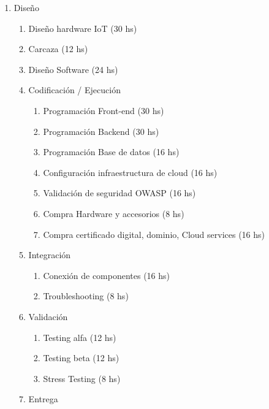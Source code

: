 \documentclass[11pt]{charter}
\begin{document}
\begin{consigna}
\begin{enumerate}
\item Diseño

        \begin{enumerate}

        \item Diseño hardware IoT (30 hs)
        \item Carcaza  (12 hs)
        \item Diseño Software (24 hs)
\item Codificación / Ejecución

        \begin{enumerate}

        \item Programación Front-end (30 hs)
        \item Programación Backend (30 hs)
        \item Programación Base de datos (16 hs)
        \item Configuración infraestructura de cloud (16 hs)

        \item Validación de seguridad OWASP (16 hs)
        \item Compra Hardware y accesorios (8 hs)
        \item Compra certificado digital, dominio, Cloud services (16 hs)
        \end{enumerate}

\item Integración

        \begin{enumerate}

        \item Conexión de componentes (16 hs)
        \item Troubleshooting (8 hs)
        \end{enumerate}

\item Validación

        \begin{enumerate}

        \item Testing alfa (12 hs)
        \item Testing beta (12 hs)
        \item Stress Testing (8 hs)
        \end{enumerate}

\item Entrega

        \begin{enumerate}


\end{enumerate}
\end{enumerate}
\end{enumerate}
\end{consigna}
\end{document}
